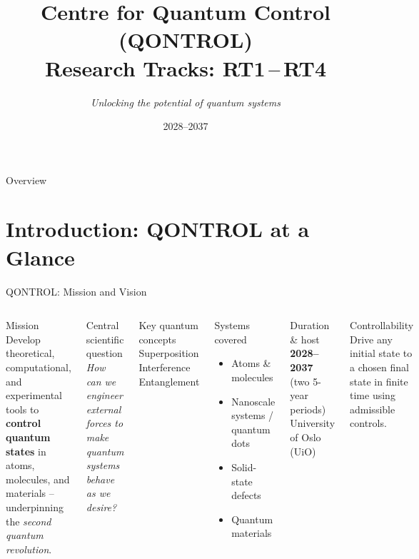 \documentclass[aspectratio=169,10pt]{beamer}
\title[QONTROL Research Tracks]{%
  \textbf{Centre for Quantum Control (QONTROL)}\\[2pt]
  \large Research Tracks: RT1\,--\,RT4}
\subtitle{\textit{Unlocking the potential of quantum systems}}
\institute[UiO]{%
  Department of Physics \& Department of Chemistry\\
  University of Oslo, Norway}
\date{2028--2037}
\begin{document}
\begin{frame}[plain]
  \titlepage
\end{frame}

\begin{frame}{Overview}
  \tableofcontents
\end{frame}

\section{Introduction: QONTROL at a Glance}

\begin{frame}{QONTROL: Mission and Vision}
  \begin{columns}[T]
      \begin{block}{Mission}
        Develop theoretical, computational, and experimental tools
        to \textbf{control quantum states} in atoms, molecules, and
        materials -- underpinning the \emph{second quantum revolution}.
      \end{block}
      \vspace{2pt}
      \begin{alertblock}{Central scientific question}
        \textit{How can we engineer external forces to make quantum
        systems behave as we desire?}
      \end{alertblock}
      \vspace{2pt}
      \begin{block}{Key quantum concepts}
        Superposition \quad\textbullet\quad Interference \quad\textbullet\quad Entanglement
      \end{block}
      \begin{block}{Systems covered}
        \begin{itemize}
          \item Atoms \& molecules
          \item Nanoscale systems / quantum dots
          \item Solid-state defects
          \item Quantum materials
        \end{itemize}
      \end{block}
      \vspace{2pt}
      \begin{block}{Duration \& host}
        \textbf{2028--2037} (two 5-year periods)\\
        University of Oslo (UiO)
      \end{block}
      \vspace{2pt}
      \begin{block}{Controllability}
        Drive any initial state to a chosen final state in
        finite time using admissible controls.
      \end{block}
  \end{columns}
\end{frame}
\end{document}
